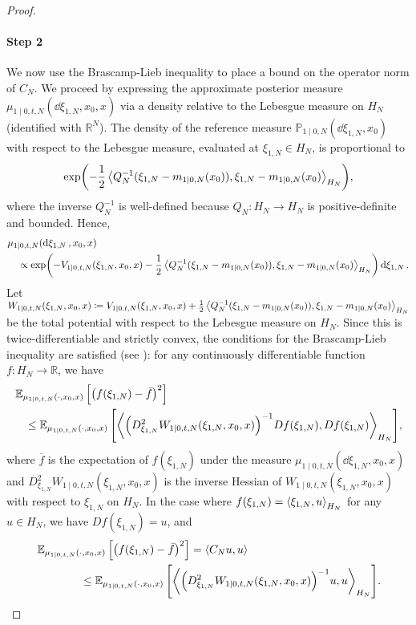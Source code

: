 \begin{proof}
  \paragraph{Step 2}
  We now use the Brascamp-Lieb inequality \citep{brascamp1976extensions} to place a bound on the operator norm of \(C_{N}\). We proceed by expressing the approximate posterior measure \(\mathbb{\mu}_{1 \mid 0, t, N}(\dd{\xi_{1, N}}, x_{0}, x)\) via a density relative to the Lebesgue measure on \(H_{N}\) (identified with \(\mathbb{R}^{N}\)). The density of the reference measure \(\mathbb{P}_{1 \mid 0, N}(\dd{\xi_{1, N}}, x_{0})\) with respect to the Lebesgue measure, evaluated at \(\xi_{1, N} \in H_{N}\), is proportional to
  \[\exp(-\frac{1}{2} \ev{Q_{N}^{-1} (\xi_{1, N} - m_{1 \mid 0, N}(x_{0})), \xi_{1, N} - m_{1 \mid 0, N}(x_{0})}_{H_{N}}),
  \]
  where the inverse \(Q_{N}^{-1}\) is well-defined because \(Q_{N} : H_{N} \to H_{N}\) is positive-definite and bounded. Hence, %
  \begin{align*}
    &\mu_{1 \mid 0, t, N}(\dd{\xi_{1, N}}, x_{0}, x) \\
    &\quad\propto \exp(-V_{1 \mid 0, t, N}(\xi_{1, N}, x_{0}, x) - \frac{1}{2} \ev{Q_{N}^{-1} (\xi_{1, N} - m_{1 \mid 0, N}(x_{0})), \xi_{1, N} - m_{1 \mid 0, N}(x_{0})}_{H_{N}}) \dd{\xi_{1, N}}.
  \end{align*}
  Let \(W_{1 \mid 0, t, N}(\xi_{1, N}, x_{0}, x) \coloneqq V_{1 \mid 0, t, N}(\xi_{1, N}, x_{0}, x) + \frac{1}{2} \ev{Q_{N}^{-1} (\xi_{1, N} - m_{1 \mid 0, N}(x_{0})), \xi_{1, N} - m_{1 \mid 0, N}(x_{0})}_{H_{N}}\)  be the total potential with respect to the Lebesgue measure on \(H_{N}\). Since this is twice-differentiable and strictly convex, the conditions for the Brascamp-Lieb inequality are satisfied (see \citep[][Theorem 4.1]{brascamp1976extensions}): for any continuously differentiable function \(f : H_{N} \to \mathbb{R}\), we have
  \begin{align*}
    &\mathop{\mathbb{E}_{\mu_{1 \mid 0, t, N}(\cdot, x_{0}, x)}}\qty[\qty(f(\xi_{1, N}) - \bar{f})^{2}]\\
    &\quad\leq \mathop{\mathbb{E}_{\mu_{1 \mid 0, t, N}(\cdot, x_{0}, x)}}\qty[\ev{ \qty(D^{2}_{\xi_{1, N}}W_{1 \mid 0, t, N}(\xi_{1, N}, x_{0}, x))^{-1} D f(\xi_{1, N}), D f(\xi_{1, N}) }_{H_{N}}],
  \end{align*}
  where \(\overline{f}\) is the expectation of \(f(\xi_{1, N})\) under the measure \(\mu_{1 \mid 0, t, N}(\dd{\xi_{1, N}, x_{0}, x})\) and \(D^{2}_{\xi_{1, N}}W_{1 \mid 0, t, N}(\xi_{1, N}, x_{0}, x)\) is the inverse Hessian of \(W_{1 \mid 0, t, N}(\xi_{1, N}, x_{0}, x)\) with respect to \(\xi_{1, N}\) on \(H_{N}\). In the case where \(f(\xi_{1, N}) = \ev{\xi_{1, N}, u}_{H_{N}}\) for any \(u \in H_{N}\), we have \(Df(\xi_{1, N}) = u\), and
  \begin{align}
    &\mathop{\mathbb{E}_{\mu_{1 \mid 0, t, N}(\cdot, x_{0}, x)}}\qty[\qty(f(\xi_{1, N}) - \bar{f})^{2}] = \ev{C_{N}u, u} \notag\\
    &\qquad\qquad\leq  \mathop{\mathbb{E}_{\mu_{1 \mid 0, t, N}(\cdot, x_{0}, x)}}\qty[\ev{ \qty(D^{2}_{\xi_{1, N}}W_{1 \mid 0, t, N}(\xi_{1, N}, x_{0}, x))^{-1} u, u }_{H_{N}}]. \label{eqn:brascamp}
  \end{align}

\end{proof}
